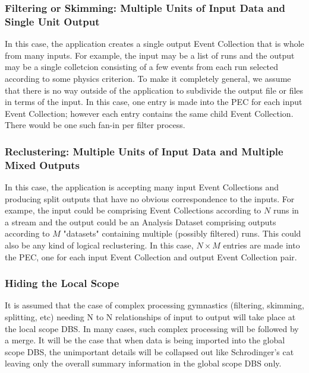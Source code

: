 \documentclass{cmspaper}
\begin{document}
\subsubsection{Filtering or Skimming: Multiple Units of Input Data and Single Unit Output}

In this case, the application creates a single output Event Collection that is whole 
from many inputs.  For example, the input may be 
a list of runs and the output may be a single colletcion consisting of a few 
events from each run selected according to some physics criterion.  To make it 
completely general, we assume that there is no way outside of the application 
to subdivide the output file or files in terms of the input.  In this case, 
one entry is made into the PEC for each input Event Collection; however each entry 
contains the same child Event Collection. There would be one such fan-in per filter process.

\subsubsection{Reclustering: Multiple Units of Input Data and Multiple Mixed Outputs}

In this case, the application is accepting many input Event Collections
and producing split outputs that have no obvious correspondence to the 
inputs.  For exampe, the input could be comprising Event Collections 
according to $N$ runs in a stream and the 
output could be an Analysis Dataset comprising outputs 
according to $M$ "datasets" containing multiple (possibly filtered) runs.  
This could also be any kind of logical reclustering.
In this case, 
$N \times M$ entries are made into the PEC, one for each input Event Collection
and output Event Collection pair.

\subsubsection{Hiding the Local Scope}

It is assumed that the case of complex processing gymnastics (filtering, skimming, splitting, 
etc) needing N to N relationships of input to output will take place at the local scope DBS.
In many cases, such complex processing will be followed by a merge.  It will be the case that
when data is being imported into the global scope DBS, the unimportant details will be collapsed 
out like Schrodinger's cat leaving only the overall summary information in the global scope DBS 
only.
\end{document}
